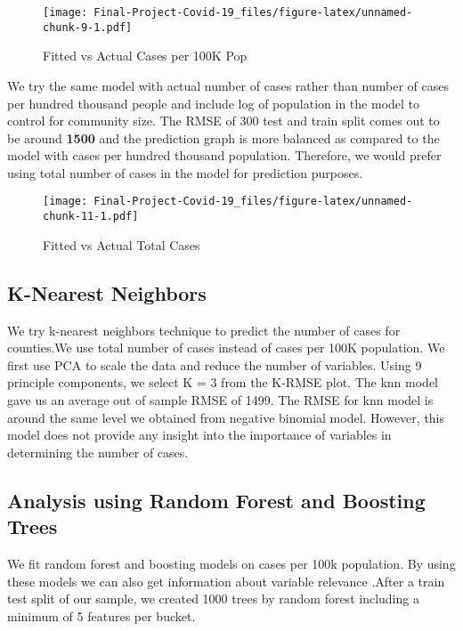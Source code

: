 \documentclass[
]{article}
\begin{document}
\begin{figure}
\centering
\texttt{[image: Final-Project-Covid-19\_files/figure-latex/unnamed-chunk-9-1.pdf]}
\caption{Fitted vs Actual Cases per 100K Pop}
\end{figure}

We try the same model with actual number of cases rather than number of
cases per hundred thousand people and include log of population in the
model to control for community size. The RMSE of 300 test and train
split comes out to be around \textbf{1500} and the prediction graph is
more balanced as compared to the model with cases per hundred thousand
population. Therefore, we would prefer using total number of cases in
the model for prediction purposes.

\begin{figure}
\centering
\texttt{[image: Final-Project-Covid-19\_files/figure-latex/unnamed-chunk-11-1.pdf]}
\caption{Fitted vs Actual Total Cases}
\end{figure}

\hypertarget{k-nearest-neighbors}{%
\subsection{K-Nearest Neighbors}\label{k-nearest-neighbors}}

We try k-nearest neighbors technique to predict the number of cases for
counties.We use total number of cases instead of cases per 100K
population. We first use PCA to scale the data and reduce the number of
variables. Using 9 principle components, we select K = 3 from the K-RMSE
plot. The knn model gave us an average out of sample RMSE of 1499. The
RMSE for knn model is around the same level we obtained from negative
binomial model. However, this model does not provide any insight into
the importance of variables in determining the number of cases.

\hypertarget{analysis-using-random-forest-and-boosting-trees}{%
\subsection{Analysis using Random Forest and Boosting
Trees}\label{analysis-using-random-forest-and-boosting-trees}}

We fit random forest and boosting models on cases per 100k population.
By using these models we can also get information about variable
relevance .After a train test split of our sample, we created 1000 trees
by random forest including a minimum of 5 features per bucket.
\end{document}
